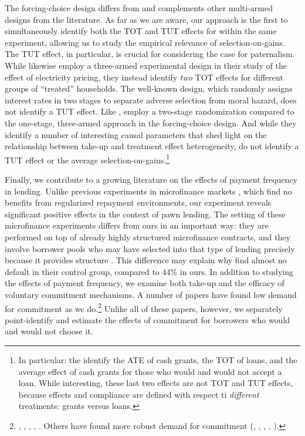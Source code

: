 \documentclass[12pt, a4paper]{article}
\begin{document}
The forcing-choice design differs from and complements other multi-armed designs from the literature.
As far as we are aware, our approach is the first to simultaneously identify both the TOT and TUT effects for within the same experiment, allowing us to study the empirical relevance of selection-on-gains.
The TUT effect, in particular, is crucial for considering the case for paternalism.
While \cite{fowlie2021default} likewise employ a three-armed experimental design in their study of the effect of electricity pricing, they instead identify \emph{two} TOT effects for different groups of ``treated'' households.
The well-known \cite{KarlanZinman2009} design, which randomly assigns interest rates in two stages to separate adverse selection from moral hazard, does not identify a TUT effect.
Like \cite{KarlanZinman2009}, \cite{Beaman2023} employ a two-stage randomization compared to the one-stage, three-armed approach in the forcing-choice design.
And while they identify a number of interesting causal parameters that shed light on the relationship between take-up and treatment effect heterogeneity, \cite{Beaman2023} do not identify a TUT effect or the average selection-on-gains.\footnote{In particular: the identify the ATE of cash grants, the TOT of loans, and the average effect of cash grants for those who would and would not accept a loan. While interesting, these last two effects are not TOT and TUT effects, because effects and compliance are defined with respect ti \emph{different} treatments: grants versus loans.}

Finally, we contribute to a growing literature on the effects of payment frequency in lending. Unlike previous experiments in microfinance markets \citep{Pande, barboni2023flexible, Field}, which find no benefits from regularized repayment environments, our experiment reveals significant positive effects in the context of pawn lending. The setting of these microfinance experiments differs from ours in an important way: they are performed on top of already highly structured microfinance contracts, and they involve borrower pools who may have selected into that type of lending precisely because it provides structure \citep{bauer2012behavioral}. This difference may explain why \cite{Pande} find almost no default in their control group, compared to 44\% in ours.
In addition to studying the effects of payment frequency, we examine both take-up and the efficacy of voluntary commitment mechanisms. A number of papers have found low demand for commitment as we do.\footnote{\cite{Ashraf}, \cite{Gine}, \cite{Ted}, \cite{Royer}, \cite{Sprenger}. Others have found more robust demand for commitment (\cite{Kremer},  \cite{Casaburi}, \cite{Alcohol}, \cite{AprajitP&P}, \cite{Pascaline}).} Unlike all of these papers, however, we separately point-identify and estimate the effects of commitment for borrowers who would and would not choose it. 
\end{document}
